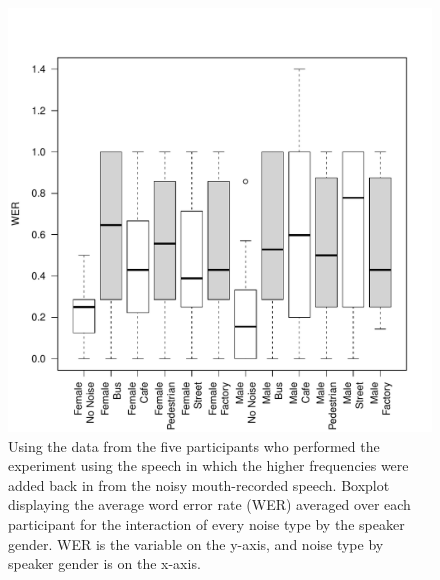 \documentclass[dissertation,copyright]{uathesis}
\makeatletter
\def\maxwidth{ %
  \ifdim\Gin@nat@width>\linewidth
    \linewidth
  \else
    \Gin@nat@width
  \fi
}
\makeatother
\begin{document}
\begin{figure}

\includegraphics[width=\maxwidth]{figure/F0_boxplot_noiseXspkr-1} 

\caption{Using the data from the five participants who performed the experiment using the speech in which the higher frequencies were added back in from the noisy mouth-recorded speech.  Boxplot displaying the average word error rate (WER) averaged over each participant for the interaction of every noise type by the speaker gender. WER is the variable on the y-axis, and noise type by speaker gender is on the x-axis.}
\label{fig:F0_noiseXspkr_boxplot}
\end{figure}
\end{document}
